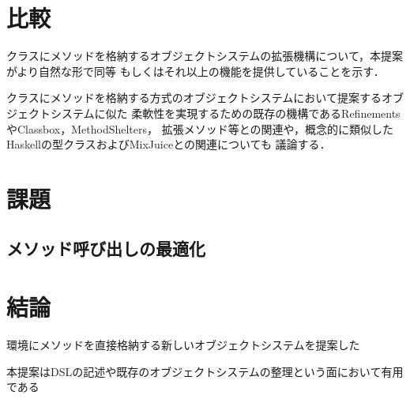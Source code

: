 \documentclass{ipsjprosym}
\begin{document}
\section{比較}

クラスにメソッドを格納するオブジェクトシステムの拡張機構について，本提案がより自然な形で同等
もしくはそれ以上の機能を提供していることを示す．

クラスにメソッドを格納する方式のオブジェクトシステムにおいて提案するオブジェクトシステムに似た
柔軟性を実現するための既存の機構であるRefinementsやClassbox，MethodShelters，
拡張メソッド等との関連や，概念的に類似したHaskellの型クラスおよびMixJuiceとの関連についても
議論する．

\section{課題}

\subsection{メソッド呼び出しの最適化}

\section{結論}

環境にメソッドを直接格納する新しいオブジェクトシステムを提案した

本提案はDSLの記述や既存のオブジェクトシステムの整理という面において有用である





\end{document}
